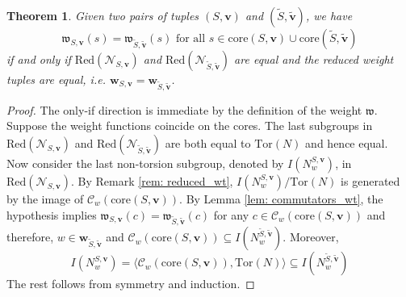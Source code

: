 \documentclass[pdflatex,sn-mathphys-num]{sn-jnl}%
\theoremstyle{thmstyleone}%
\newtheorem{theo}{Theorem}%
\theoremstyle{thmstyletwo}%
\theoremstyle{thmstylethree}%
\begin{document}
\begin{theo}
\label{thm: wt_series} 
  Given two pairs of tuples $(S,\mathbf v)$ and $(\tilde{S},\tilde{\mathbf v})$, we have
$$\mathfrak w_{S,\mathbf v}(s)=\mathfrak w_{\tilde{S},\tilde{\mathbf v}}(s)
\mbox{ for all } s\in \mbox{core}(S,\mathbf{v}) \cup \mbox{core}(\tilde{S}, \tilde{\mathbf{v}})$$  
if and only if $\mbox{Red}(\mathcal{N}_{S, \mathbf v})$ and $\mbox{Red}(\mathcal{N}_{\tilde{S}, \tilde{\mathbf v}})$ are equal and the reduced weight tuples are equal, i.e. $\mathbf{w}_{S, \mathbf v} = \mathbf{w}_{\tilde{S}, \tilde{\mathbf v}}$. 
\end{theo}

\begin{proof}  
The only-if direction is immediate by the definition of the weight $\mathfrak{w}$. Suppose the weight functions coincide on the cores. The last subgroups in $\mbox{Red}(\mathcal{N}_{S, \mathbf v})$ and $\mbox{Red}(\mathcal{N}_{\tilde{S}, \tilde{\mathbf v}})$ are both equal to $\mbox{Tor}(N)$ and hence equal. Now consider  the last non-torsion subgroup, denoted by $I(N_w^{S, \mathbf v})$, in $\mbox{Red}(\mathcal{N}_{S, \mathbf v})$. By  Remark \ref{rem: reduced_wt}, $I(N_w^{S, \mathbf v})/\mbox{Tor}(N)$ is generated by the image of $\mathcal{C}_{w}(\mbox{core}(S,\mathbf{v}))$. By Lemma \ref{lem: commutators_wt}, the hypothesis implies $\mathfrak w_{S,\mathbf v}(c)=\mathfrak w_{\tilde{S},\tilde{\mathbf v}}(c)$ for any $c \in \mathcal{C}_{w}(\mbox{core}(S,\mathbf{v}))$ and therefore, $w \in \mathbf{w}_{\tilde{S}, \tilde{\mathbf v}}$ and $\mathcal{C}_{w}(\mbox{core}(S,\mathbf{v})) \subseteq I(N_w^{\tilde{S},\tilde{\mathbf{v}}})$. Moreover, 
$$I(N_w^{S, \mathbf v}) = \langle \mathcal{C}_{w}(\mbox{core}(S,\mathbf{v})), \mbox{Tor}(N)\rangle \subseteq I(N_w^{\tilde{S},\tilde{\mathbf{v}}})$$
The rest follows from symmetry and induction. 
\end{proof}
\end{document}
